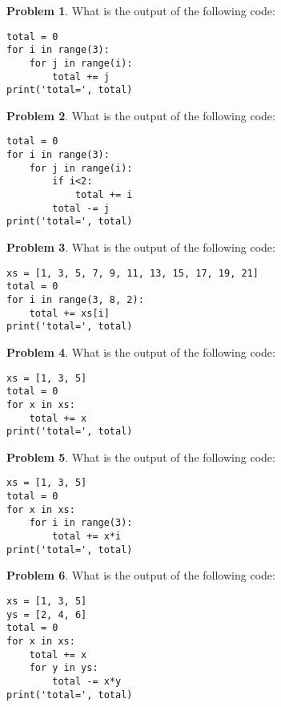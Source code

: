 \documentclass[10pt]{article}
\theoremstyle{definition}
\newtheorem{problem}{Problem}
\begin{document}
\begin{problem}
    What is the output of the following code:
\end{problem}
\begin{lstlisting}
total = 0
for i in range(3):
    for j in range(i):
        total += j
print('total=', total)
\end{lstlisting}
\vspace{1.5in}

\begin{problem}
    What is the output of the following code:
\end{problem}
\begin{lstlisting}
total = 0
for i in range(3):
    for j in range(i):
        if i<2:
            total += i
        total -= j
print('total=', total)
\end{lstlisting}
\vspace{1.5in}

\begin{problem}
    What is the output of the following code:
\end{problem}
\begin{lstlisting}
xs = [1, 3, 5, 7, 9, 11, 13, 15, 17, 19, 21]
total = 0
for i in range(3, 8, 2):
    total += xs[i]
print('total=', total)
\end{lstlisting}

\newpage
\begin{problem}
    What is the output of the following code:
\end{problem}
\begin{lstlisting}
xs = [1, 3, 5]
total = 0
for x in xs:
    total += x
print('total=', total)
\end{lstlisting}
\vspace{1.5in}

\begin{problem}
    What is the output of the following code:
\end{problem}
\begin{lstlisting}
xs = [1, 3, 5]
total = 0
for x in xs:
    for i in range(3):
        total += x*i
print('total=', total)
\end{lstlisting}
\vspace{1.5in}


\begin{problem}
    What is the output of the following code:
\end{problem}
\begin{lstlisting}
xs = [1, 3, 5]
ys = [2, 4, 6]
total = 0
for x in xs:
    total += x
    for y in ys:
        total -= x*y
print('total=', total)
\end{lstlisting}
\vspace{1.5in}
\end{document}
